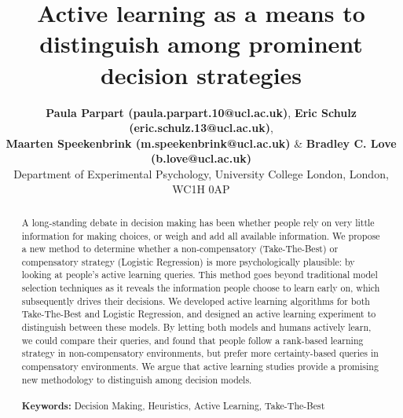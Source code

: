 \documentclass[10pt,letterpaper]{article}
\title{Active learning as a means to distinguish among prominent decision strategies}
\author{{\large \bf Paula Parpart (paula.parpart.10@ucl.ac.uk)}, {\large \bf Eric Schulz (eric.schulz.13@ucl.ac.uk)}, \\{\large \bf Maarten Speekenbrink (m.speekenbrink@ucl.ac.uk)} \& {\large \bf Bradley C. Love (b.love@ucl.ac.uk)}\medskip\\
Department of Experimental Psychology, University College London, London, WC1H 0AP}
\begin{document}
\maketitle

\begin{abstract}
A long-standing debate in decision making has been whether people rely on very little information for making choices, or weigh and add all available information. We propose a new method to determine whether a non-compensatory (Take-The-Best) or compensatory strategy (Logistic Regression) is more psychologically plausible: by looking at people’s active learning queries. This method goes beyond traditional model selection techniques as it reveals the information people choose to learn early on, which subsequently drives their decisions.  We developed active learning algorithms for both Take-The-Best and Logistic Regression, and designed an active learning experiment to distinguish between these models. By letting both models and humans actively learn, we could compare their queries, and found that people follow a rank-based learning strategy in non-compensatory environments, but prefer more certainty-based queries in compensatory environments. We argue that active learning studies provide a promising new methodology to distinguish among decision models.\\ 
\medskip\\
\textbf{Keywords:} 
Decision Making, Heuristics, Active Learning, Take-The-Best
\end{abstract}
\end{document}

